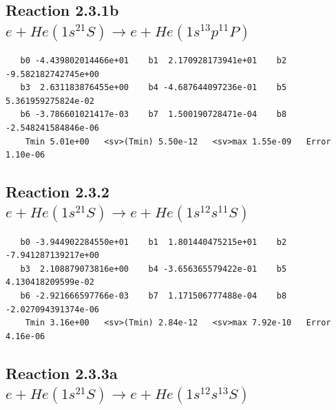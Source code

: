 \documentclass[12pt,dvipdfmx]{article}
\begin{document}
\newpage
\subsection{
Reaction 2.3.1b $e + He(1s^21S) \rightarrow e + He(1s^13p^11P)$}















\begin{small}\begin{verbatim}
   b0 -4.439802014466e+01    b1  2.170928173941e+01    b2 -9.582182742745e+00
   b3  2.631183876455e+00    b4 -4.687644097236e-01    b5  5.361959275824e-02
   b6 -3.786601021417e-03    b7  1.500190728471e-04    b8 -2.548241584846e-06
    Tmin 5.01e+00   <sv>(Tmin) 5.50e-12   <sv>max 1.55e-09   Error 1.10e-06
\end{verbatim}\end{small}

\newpage
\subsection{
Reaction 2.3.2 $e + He(1s^21S) \rightarrow e + He(1s^12s^11S)$}















\begin{small}\begin{verbatim}
   b0 -3.944902284550e+01    b1  1.801440475215e+01    b2 -7.941287139217e+00
   b3  2.108879073816e+00    b4 -3.656365579422e-01    b5  4.130418209599e-02
   b6 -2.921666597766e-03    b7  1.171506777488e-04    b8 -2.027094391374e-06
    Tmin 3.16e+00   <sv>(Tmin) 2.84e-12   <sv>max 7.92e-10   Error 4.16e-06
\end{verbatim}\end{small}

\newpage
\subsection{
Reaction 2.3.3a $  e + He(1s^21S) \rightarrow e + He(1s^12s^13S)$}
\end{document}
